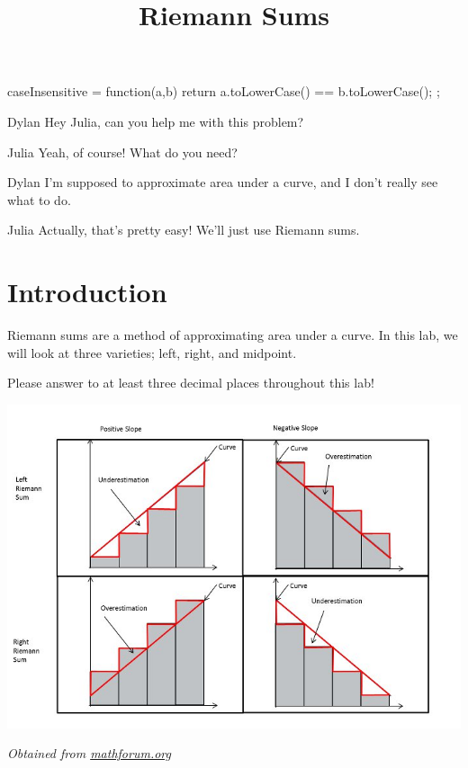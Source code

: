 \documentclass{ximera}
\title{Riemann Sums}
\begin{document}
\maketitle
\begin{javascript}
 caseInsensitive = function(a,b) {
    return a.toLowerCase() == b.toLowerCase();
  };
\end{javascript}
\begin{dialogue}
\item[Dylan] Hey Julia, can you help me with this problem?
\item[Julia] Yeah, of course! What do you need?
\item[Dylan] I'm supposed to approximate area under a curve, and I don't really see what to do.
\item[Julia] Actually, that's pretty easy! We'll just use Riemann sums.
\end{dialogue}

\section{Introduction}
Riemann sums are a method of approximating area under a curve. In this lab, we will look at three varieties; left, right, and midpoint.

Please answer to at least three decimal places throughout this lab!

\begin{image}
\includegraphics{Table}
\end{image}
\begin{center}
\textit{Obtained from \href{http://mathforum.org/mathimages/index.php/Riemann_Sums}{mathforum.org}}
\end{center}
\end{document}

